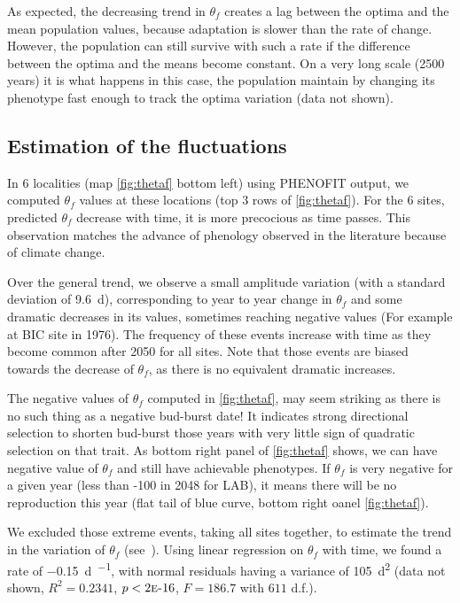 As expected, the decreasing trend in $\theta_f$ creates a lag between the optima and the mean population values, because adaptation is slower than the rate of change. However, the population can still survive with such a rate if the difference between the optima and the means become constant. On a very long scale (2500 years) it is what happens in this case, the population maintain by changing its phenotype fast enough to track the optima variation (data not shown).

\subsection*{Estimation of the fluctuations}

In 6 localities (map \autoref{fig:thetaf} bottom left) using \textsc{PHENOFIT} output, we computed $\theta_f$ values at these locations (top 3 rows of \autoref{fig:thetaf}). For the 6 sites, predicted $\theta_f$ decrease with time, it is more precocious as time passes. This observation matches the advance of phenology observed in the literature because of climate change.

Over the general trend, we observe a small amplitude variation (with a standard deviation of \SI{9.6}{\day}), corresponding to year to year change in $\theta_f$ and some dramatic decreases in its values, sometimes reaching negative values (For example at BIC site in 1976). The frequency of these events increase with time as they become common after 2050 for all sites. Note that those events are biased towards the decrease of $\theta_f$, as there is no equivalent dramatic increases.

The negative values of $\theta_f$ computed in \autoref{fig:thetaf}, may seem striking as there is no such thing as a negative bud-burst date! It indicates strong directional selection to shorten bud-burst those years with very little sign of quadratic selection on that trait. As bottom right panel of \autoref{fig:thetaf} shows, we can have negative value of $\theta_f$ and still have achievable phenotypes. If $\theta_f$ is very negative for a given year (less than -100 in 2048 for LAB), it means there will be no reproduction this year (flat tail of blue curve, bottom right oanel \autoref{fig:thetaf}).

We excluded those extreme events, taking all sites together, to estimate the trend in the variation of $\theta_f$ (see~). Using linear regression on $\theta_f$ with time, we found a rate of \SI{-0.15}{\day\per\year}, with normal residuals having a variance of \SI{105}{\day\squared} (data not shown, $R^2=0.2341$, $p<2\text{\sc{e}-}16$, $F=186.7$ with $611$ d.f.).

